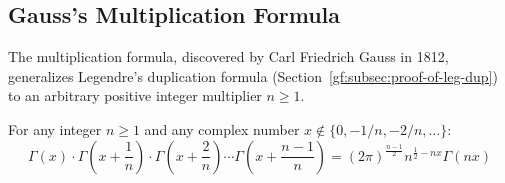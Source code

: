 \documentclass[a4paper]{article}
\begin{document}
    \subsection{Gauss's Multiplication Formula}\label{gf:subsec:gauss-multiplication-formula}

    The multiplication formula, discovered by Carl Friedrich Gauss in 1812, generalizes Legendre's duplication formula (Section~\ref{gf:subsec:proof-of-leg-dup}) to an arbitrary positive integer multiplier $n \ge 1$.

    \begin{theorem}
        For any integer $n \ge 1$ and any complex number $x \notin \{0, -1/n, -2/n, \dots\}$:
        \begin{equation}
            \label{gf:eq:legendre-mult}
            \boxed{
                \Gamma(x) \cdot \Gamma\left(x+\frac{1}{n}\right) \cdot \Gamma\left(x+\frac{2}{n}\right) \cdots \Gamma\left(x+\frac{n-1}{n}\right) = (2 \pi)^{\frac{n-1}{2}} n^{\frac{1}{2} - nx} \Gamma(nx)
            }
        \end{equation}


\end{theorem}
\end{document}
